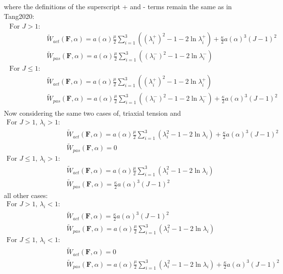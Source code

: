 \documentclass[12pt,3p]{article}
\numberwithin{equation}{section}
\begin{document}
where the definitions of the superscript + and - terms remain the same as in Tang2020:
\begin{align}
\begin{split}
\text{For } J > 1: & \\
& \widetilde{W}_{act} (\mathbf{F}, \alpha) = a(\alpha) \frac{\mu}{2} \sum_{i = 1}^3 ( (\lambda_i^+)^2 - 1 - 2 \ln \lambda_i^+) + \frac{\kappa}{2} a(\alpha)^3 (J-1)^2 \\
& \widetilde{W}_{pas} (\mathbf{F}, \alpha) = a(\alpha) \frac{\mu}{2} \sum_{i = 1}^3 ( (\lambda_i^-)^2 - 1 - 2 \ln \lambda_i^-) \\
\text{For } J \leq 1: \\
& \widetilde{W}_{act} (\mathbf{F}, \alpha) = a(\alpha) \frac{\mu}{2} \sum_{i = 1}^3 ( (\lambda_i^+)^2 - 1 - 2 \ln \lambda_i^+) \\
& \widetilde{W}_{pas} (\mathbf{F}, \alpha) = a(\alpha) \frac{\mu}{2} \sum_{i = 1}^3 ( (\lambda_i^-)^2 - 1 - 2 \ln \lambda_i^-) + \frac{\kappa}{2} a(\alpha)^3 (J -1)^2 
\end{split}
\end{align}
Now considering the same two cases of, triaxial tension and 
\begin{align*}
\text{For } J > 1,\, \lambda_i > 1: & \\
& \widetilde{W}_{act} (\mathbf{F}, \alpha) = a(\alpha) \frac{\mu}{2} \sum_{i = 1}^3 ( \lambda_i^2 - 1 - 2 \ln \lambda_i) + \frac{\kappa}{2} a(\alpha)^3 (J-1)^2 \\
& \widetilde{W}_{pas} (\mathbf{F}, \alpha) = 0 \\
\text{For } J \leq 1,\, \lambda_i > 1: \\
& \widetilde{W}_{act} (\mathbf{F}, \alpha) = a(\alpha) \frac{\mu}{2} \sum_{i = 1}^3 ( \lambda_i^2 - 1 - 2 \ln \lambda_i) \\
& \widetilde{W}_{pas} (\mathbf{F}, \alpha) = \frac{\kappa}{2} a(\alpha)^3 (J -1)^2 
\end{align*}
all other cases:
\begin{align*}
\text{For } J > 1,\, \lambda_i < 1: & \\
& \widetilde{W}_{act} (\mathbf{F}, \alpha) =  \frac{\kappa}{2} a(\alpha)^3 (J-1)^2 \\
& \widetilde{W}_{pas} (\mathbf{F}, \alpha) = a(\alpha) \frac{\mu}{2} \sum_{i = 1}^3 ( \lambda_i^2 - 1 - 2 \ln \lambda_i) \\
\text{For } J \leq 1,\, \lambda_i < 1: \\
& \widetilde{W}_{act} (\mathbf{F}, \alpha) = 0 \\
& \widetilde{W}_{pas} (\mathbf{F}, \alpha) = a(\alpha) \frac{\mu}{2} \sum_{i = 1}^3 ( \lambda_i^2 - 1 - 2 \ln \lambda_i) + \frac{\kappa}{2} a(\alpha)^3 (J-1)^2 
\end{align*}
\end{document}

